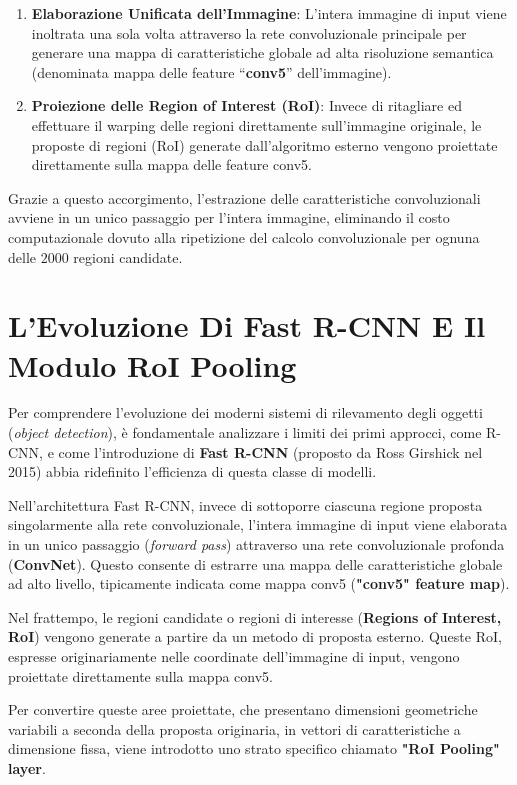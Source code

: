 ﻿\documentclass[11pt, a4paper]{article}
\begin{document}
\begin{enumerate}[noitemsep]
    \item \textbf{Elaborazione Unificata dell'Immagine}: L'intera immagine di input viene inoltrata una sola volta attraverso la rete convoluzionale principale per generare una mappa di caratteristiche globale ad alta risoluzione semantica (denominata mappa delle feature ``\textbf{conv5}'' dell'immagine).
    \item \textbf{Proiezione delle Region of Interest (RoI)}: Invece di ritagliare ed effettuare il warping delle regioni direttamente sull'immagine originale, le proposte di regioni (RoI) generate dall'algoritmo esterno vengono proiettate direttamente sulla mappa delle feature conv5.
\end{enumerate}

Grazie a questo accorgimento, l'estrazione delle caratteristiche convoluzionali avviene in un unico passaggio per l'intera immagine, eliminando il costo computazionale dovuto alla ripetizione del calcolo convoluzionale per ognuna delle $2000$ regioni candidate.

\section{L'Evoluzione Di Fast R-CNN E Il Modulo RoI Pooling}

Per comprendere l'evoluzione dei moderni sistemi di rilevamento degli oggetti (\emph{object detection}), è fondamentale analizzare i limiti dei primi approcci, come R-CNN, e come l'introduzione di \textbf{Fast R-CNN} (proposto da Ross Girshick nel 2015) abbia ridefinito l'efficienza di questa classe di modelli.

Nell'architettura Fast R-CNN, invece di sottoporre ciascuna regione proposta singolarmente alla rete convoluzionale, l'intera immagine di input viene elaborata in un unico passaggio (\emph{forward pass}) attraverso una rete convoluzionale profonda (\textbf{ConvNet}). Questo consente di estrarre una mappa delle caratteristiche globale ad alto livello, tipicamente indicata come mappa conv5 (\textbf{"conv5" feature map}).

Nel frattempo, le regioni candidate o regioni di interesse (\textbf{Regions of Interest, RoI}) vengono generate a partire da un metodo di proposta esterno. Queste RoI, espresse originariamente nelle coordinate dell'immagine di input, vengono proiettate direttamente sulla mappa conv5.

Per convertire queste aree proiettate, che presentano dimensioni geometriche variabili a seconda della proposta originaria, in vettori di caratteristiche a dimensione fissa, viene introdotto uno strato specifico chiamato \textbf{"RoI Pooling" layer}.
\end{document}
